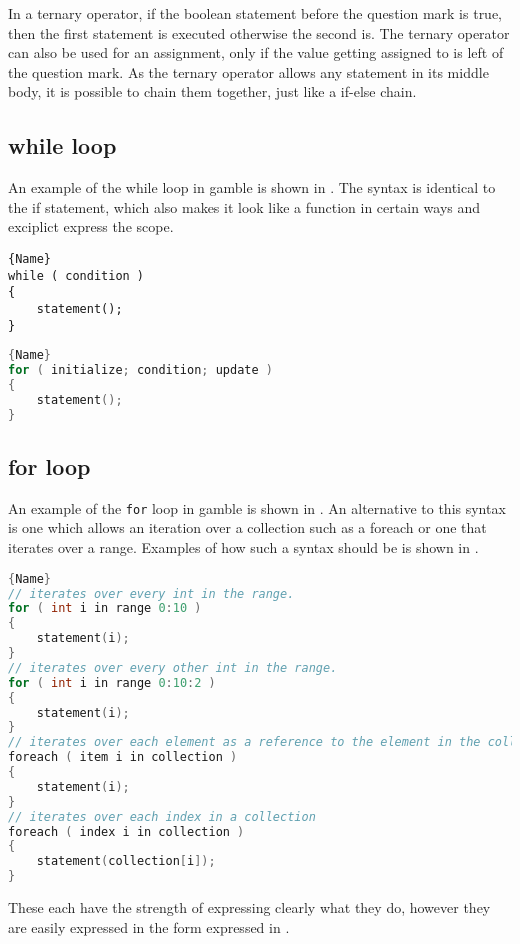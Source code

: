 In a ternary operator, if the boolean statement before the question mark is true, then the first statement is executed otherwise the second is. 
The ternary operator can also be used for an assignment, only if the value getting assigned to is left of the question mark.
As the ternary operator allows any statement in its middle body, it is possible to chain them together, just like a if-else chain. 

\subsection{while loop}
An example of the while loop in \gls{gamble} is shown in . 
The syntax is identical to the if statement, which also makes it look like a function in certain ways and exciplict express the scope.

\vspace{10pt}
\noindent\begin{minipage}{.40\textwidth}
\begin{lstlisting}[caption=A while loop in \gls{gamble}.,frame=tlrb, label=whilelst, numbers=none]{Name}
while ( condition )
{
    statement();
}
\end{lstlisting}
\end{minipage}\hfill
\begin{minipage}{.50\textwidth}
\begin{lstlisting}[caption=A for loop in \gls{gamble}.,frame=tlrb, label=forlst, numbers=none, language=C]{Name}
for ( initialize; condition; update )
{
    statement();
}
\end{lstlisting}
\end{minipage}

\subsection{for loop}
An example of the \texttt{for} loop in \gls{gamble} is shown in .
An alternative to this syntax is one which allows an iteration over a collection such as a foreach or one that iterates over a range.
Examples of how such a syntax should be is shown in .

\begin{lstlisting}[caption=Alternative syntaxes for the for loop.,frame=tlrb, label=forextlst, numbers=none, language=C]{Name}
// iterates over every int in the range.
for ( int i in range 0:10 )
{
    statement(i);
}
// iterates over every other int in the range.
for ( int i in range 0:10:2 )
{
    statement(i);
}
// iterates over each element as a reference to the element in the collection
foreach ( item i in collection )
{
    statement(i);
}
// iterates over each index in a collection
foreach ( index i in collection )
{
    statement(collection[i]);
}
\end{lstlisting}

These each have the strength of expressing clearly what they do, however they are easily expressed in the form expressed in .
